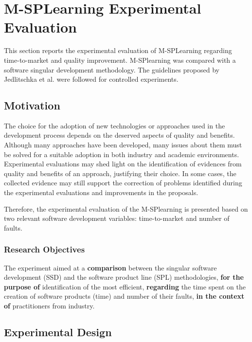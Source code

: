 
\section{M-SPLearning Experimental Evaluation}\label{section4}

This section reports the experimental evaluation of M-SPLearning regarding time-to-market and quality improvement. M-SPlearning was compared with a software singular development methodology. The guidelines proposed by Jedlitschka et al. \cite{jedlitschka07} were followed for controlled experiments.

\subsection{Motivation}\label{sub:motivation}


The choice for the adoption of new technologies or approaches used in the development process depends on the deserved aspects of quality and benefits. Although many approaches have been developed, many issues about them must be solved for a suitable adoption in both industry and academic environments. Experimental evaluations may shed light on the identification of evidences from quality and benefits of an approach, justifying their choice. In some cases, the collected evidence may still support the correction of problems identified during the experimental evaluations and improvements in the proposals.

Therefore, the experimental evaluation of the M-SPlearning is presented based on two relevant software development variables: time-to-market and number of faults.

\subsubsection{Research Objectives}\label{sub:object}

The experiment aimed at a \textbf{comparison} between the singular software development (SSD) and the software product line (SPL) methodologies, \textbf{for the purpose of} identification of the most efficient, \textbf{regarding} the time spent on the creation of software products (time) and number of their faults, \textbf{in the context of} practitioners from industry.


\subsection{Experimental Design}\label{sub:design}

